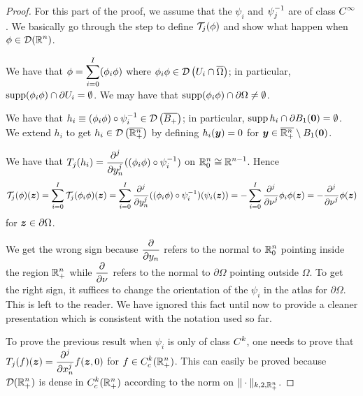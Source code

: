 \begin{proof}
For this part of the proof, we assume that the $\psi_i$ and
$\DS \psi_j^{-1}$ are of class $\DS C^\infty$.  We
basically go through the step to define $\TT_j(\phi)$ and show what happen when
$\DS \phi \in \DD(\RR^n)$.

We have that $\DS \phi = \sum_{i=0}^I (\phi_i \phi)$ where
$\DS \phi_i \phi \in \DD\left(U_i \cap \overline{\Omega}\right)$;
in particular, $\supp (\phi_i \phi) \cap \partial U_i = \emptyset$.
We may have that
$\supp (\phi_i \phi) \cap \partial \Omega \neq \emptyset$.

We have that
$\DS h_i \equiv (\phi_i \phi) \circ \psi_i^{-1}
\in \DD\left(\overline{B_+}\right)$; in particular,
$\DS \supp h_i \cap \partial B_1(\VEC{0}) = \emptyset$.  We
extend $h_i$ to get
$\DS h_i \in \DD\left(\overline{\RR^n_+}\right)$ by defining
$h_i(\VEC{y}) = 0$ for
$\DS \VEC{y} \in \overline{\RR^n_+} \setminus B_1(\VEC{0})$.

We have that $\DS T_j(h_i)
= \pdfdxn{((\phi_i \phi) \circ \psi_i^{-1})}{y_n}{j}$ on
$\DS \RR^n_0 \cong \RR^{n-1}$.  Hence
\[
\TT_j(\phi)(\VEC{z})
= \sum_{i=0}^I \TT_j(\phi_i \phi)(\VEC{z})
= \sum_{i=0}^I \pdfdxn{((\phi_i \phi) \circ \psi_i^{-1})}{y_n}{j}
(\psi_i(\VEC{z}))
= - \sum_{i=0}^I \pdfdxn{\phi_i \phi}{\nu}{j} (\VEC{z})
= -\pdfdxn{\phi}{\nu}{j} (\VEC{z})
\]
for $\VEC{z} \in \partial \Omega$.

We get the wrong sign because $\DS \pdydx{}{y_n}$ refers to
the normal to $\DS \RR^n_0$ pointing inside the region
$\DS \RR^n_+$ while
$\DS \pdydx{}{\nu}$ refers to the normal to $\partial \Omega$
pointing outside $\Omega$.  To get the right sign, it suffices to
change the orientation of the $\psi_i$ in the atlas for $\partial \Omega$.
This is left to the reader.  We have ignored this fact until
now to provide a cleaner presentation which is consistent with the
notation used so far.

To prove the previous result when $\psi_i$ is only of class
$\DS C^k$, one needs to prove that
$\DS T_j(f)(\VEC{z}) = \pdfdxn{f}{x_n}{j}(\VEC{z},0)$
for $\DS f \in C_c^k(\RR^n_+)$.  This can easily be proved
because $\DS \DD(\RR^n_+)$ is dense in
$\DS C_c^k(\RR^n_+)$ according to the norm on
$\DS \|\cdot\|_{k,2,\RR^n_+}$.
\end{proof}


